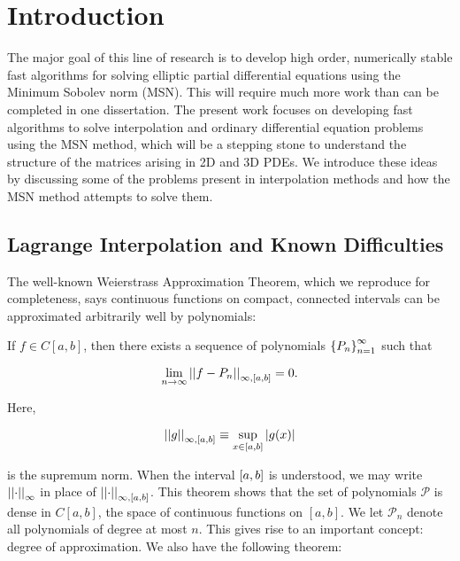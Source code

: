 \chapter{Introduction}
\label{chap:intro}

The major goal of this line of research is to develop
high order, numerically stable fast algorithms for solving elliptic
partial differential equations using the Minimum Sobolev norm (MSN).
This will require much more work than can be completed in one dissertation.
The present work focuses on developing fast algorithms to solve interpolation
and ordinary differential equation problems using the MSN method,
which will be a stepping stone to understand the
structure of the matrices arising in 2D and 3D PDEs.
We introduce these ideas by discussing some of the problems
present in interpolation methods and how the MSN method
attempts to solve them.



\section{Lagrange Interpolation and Known Difficulties}
\label{sec:int_class_interp}

The well-known Weierstrass Approximation Theorem, which we reproduce for
completeness, says continuous functions on compact, connected intervals can
be approximated arbitrarily well by polynomials:

\begin{thm}
\label{thm:WeierstrassThm}
If $f\in C[a,b]$, then there exists a sequence
of polynomials $\left\{ P_{n} \right\}_{n=1}^{\infty}$ such that

\begin{equation}
    \lim_{n\to\infty} \left| \left| f-P_{n} \right| \right|_{\infty,[a,b]} = 0.
\end{equation}
\end{thm}

\noindent
Here,

\begin{equation}
    \left| \left| g \right| \right|_{\infty,[a,b]} \equiv \sup_{x\in\left[ a,b \right]} \left| g(x) \right|
\end{equation}

\noindent
is the supremum norm.
When the interval $\left[ a,b \right]$ is understood, we may
write $\left| \left| \cdot \right| \right|_{\infty}$ in place of $\left| \left| \cdot \right| \right|_{\infty,[a,b]}$.
This theorem shows that the set of polynomials $\mathcal{P}$
is dense in $C[a,b]$, the space of continuous functions on $[a,b]$.
We let $\mathcal{P}_{n}$ denote all polynomials of degree at most $n$.
This gives rise to an important concept: degree of
approximation.
We also have the following theorem:

